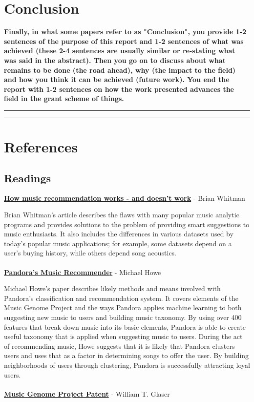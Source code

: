 \documentclass[12pt]{article}
\newcommand{\horizontalLine}{
	\begin{center}
		\hrule width 1.0\textwidth
	\end{center}
}
\newcommand{\smallHorizontalLine}{
    \begin{center}
        \hrule width 0.5\textwidth
    \end{center}}
\begin{document}
\section{Conclusion}
\label{sec:conclusion}
\textbf{Finally, in what some papers refer to as "Conclusion", you provide 1-2 sentences of the purpose
of this report and 1-2 sentences of what was achieved (these 2-4 sentences are usually similar
or re-stating what was said in the abstract). Then you go on to discuss about what remains to
be done (the road ahead), why (the impact to the field) and how you think it can be achieved
(future work). You end the report with 1-2 sentences on how the work presented advances the
field in the grant scheme of things.}
\smallHorizontalLine

\horizontalLine
\section{References}
\label{sec:references}

\subsection{Readings}
\href{http://notes.variogr.am/post/37675885491/how-music-recommendation-works-and-doesnt-work}{\textbf{How music recommendation works - and doesn't work}} - Brian Whitman

Brian Whitman's article describes the flaws with many popular music analytic programs and provides solutions to the problem of providing smart suggestions to music enthusiasts. It also includes the differences in various datasets used by today's popular music applications; for example, some datasets depend on a user's buying history, while others depend song acoustics.
\\
\\
\href{http://courses.cs.washington.edu/courses/csep521/07wi/prj/michael.pdf}{\textbf{Pandora's Music Recommende}r} - Michael Howe 

Michael Howe's paper describes likely methods and means involved with Pandora's classification and recommendation system. It covers elements of the Music Genome Project and the ways Pandora applies machine learning to both suggesting new music to users and building music taxonomy. By using over 400 features that break down music into its basic elements, Pandora is able to create useful taxonomy that is applied when suggesting music to users. During the act of recommending music, Howe suggests that it is likely that Pandora clusters users and uses that as a factor in determining songs to offer the user. By building neighborhoods of users through clustering, Pandora is successfully attracting loyal users.
\\
\\
\href{http://www.google.com/patents/US7003515?dq=7,003,515}{\textbf{Music Genome Project Patent}} - William T. Glaser 
\end{document}
